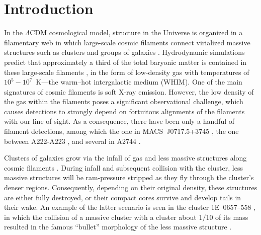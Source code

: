 \section{Introduction}


In the $\Lambda$CDM cosmological model, structure in the Universe is organized in a filamentary web in which large-scale cosmic filaments connect virialized massive structures such as clusters and groups of galaxies \citep[e.g., ][]{Einasto1994}. Hydrodynamic simulations predict that approximately a third of the total baryonic matter is contained in these large-scale filaments \citep[e.g.][]{Dave2001}, in the form of low-density gas with temperatures of $10^5-10^7$~K---the warm--hot intergalactic medium (WHIM). One of the main signatures of cosmic filaments is soft X-ray emission. However, the low density of the gas within the filaments poses a significant observational challenge, which causes detections to strongly depend on fortuitous alignments of the filaments with our line of sight. As a consequence, there have been only a handful of filament detections, among which the one in MACS~J0717.5+3745 \citep{Ebeling2004}, the one between A222-A223 \citep{Dietrich2005, Werner2008}, and several in A2744 \citep{Eckert2015}.

Clusters of galaxies grow via the infall of gas and less massive structures along cosmic filaments \citep[e.g.,][]{Springel2006}. During infall and subsequent collision with the cluster, less massive structures will be ram-pressure stripped as they fly through the cluster's denser regions. Consequently, depending on their original density, these structures are either fully destroyed, or their compact cores survive and develop tails in their wake. An example of the latter scenario is seen in the cluster 1E~0657--558 \citep{Elvis1992}, in which the collision of a massive cluster with a cluster about $1/10$ of its mass \citep{Springel2007, Mastropietro2008} resulted in the famous ``bullet'' morphology of the less massive structure \citep{Markevitch2002}.


